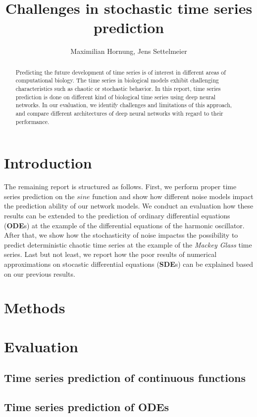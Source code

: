 \documentclass{article}
\title{Challenges in stochastic time series prediction}
\author{Maximilian Hornung, Jens Settelmeier}
\begin{document}
\maketitle

\begin{abstract}
    Predicting the future development of time series is of interest in different
    areas of computational biology. The time series in biological models exhibit
    challenging characteristics such as chaotic or stochastic behavior. In this
    report, time series prediction is done on different kind of biological time
    series using deep neural networks. In our evaluation, we identify challenges
    and limitations of this approach, and compare different architectures of
    deep neural networks with regard to their performance.
\end{abstract}

\section{Introduction}

The remaining report is structured as follows. First, we perform proper time 
series prediction on the $sine$ function and show how different noise models
impact the prediction ability of our network models. We conduct an evaluation
how these results can be extended to the prediction of 
ordinary differential equations (\textbf{ODE}s) at the example of the 
differential equations of the harmonic oscillator. After that, we show how the
stochasticity of noise impactss the possibility to predict deterministic
chaotic time series at the example of the \emph{Mackey Glass} time series. Last
but not least, we report how the poor results of numerical approximations on 
stocastic differential equations (\textbf{SDE}s) can be explained based on our
previous results.

\section{Methods}

\section{Evaluation}
\subsection{Time series prediction of continuous functions}

\subsection{Time series prediction of ODEs}
 
\end{document}
